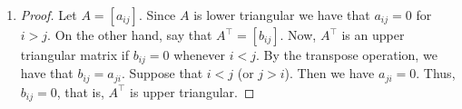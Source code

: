 \begin{enumerate}[!HW!, start=1]
\itemspade $LU = \mtx{cc}{1&0\\-\frac{3}{2}&1}\mtx{rr}{2&-2\\0&3}$, \quad
$\mtx{c|c}{L & \bb b} %
\sim \mtx{cc|r}{1&0&4\\0&1&15}$, \quad $\mtx{c|c}{U & \bb y} %
\sim \mtx{cc|r}{1&0&7\\0&1&5}$

\itemspade $LU = \mtx{crr}{1&0&0\\-2&1&0\\-1/2&-1&1}\mtx{rrr}{2&2&-2\\0&1&0\\0&0&3}$, \quad $\mtx{c|c}{L & \bb b} %
\sim \mtx{ccc|r}{1&0&0&-4\\0&1&0&-10\\0&0&1&-6}$, \quad 
$\mtx{c|c}{U & \bb y}%
\sim \mtx{ccc|r}{1&0&0&6\\0&1&0&-10\\0&0&1&-2}$

\itemspade $LU = \mtx{ccc}{1&0&0\\3&1&0\\2&1&1}\mtx{rrr}{2&1&2\\0&3&1\\0&0&5}$, \quad $\mtx{c|c}{L & \bb b} %
\sim \mtx{ccc|r}{1&0&0&1\\0&1&0&6\\0&0&1&2}$, \quad $\mtx{c|c}{U & \bb y} %
\sim \mtx{ccc|r}{1&0&0&5\\0&1&0&0\\0&0&1&6}$ 

\item %
\begin{proof}
Let $A = [a_{ij}]$. Since $A$ is lower triangular we have that $a_{ij} = 0$ for $i > j$. On the other hand, say that $A^\top  = [b_{ij}]$. Now, $A^\top $ is an upper triangular matrix if $b_{ij} = 0$ whenever $i < j$. By the transpose operation, we have that $b_{ij} = a_{ji}$. Suppose that $i < j$ (or $j > i$). Then we have $a_{ji} = 0$. Thus, $b_{ij}=0$, that is, $A^\top $ is upper triangular.
\end{proof} 
\end{enumerate}

\vspace{-15 pt}